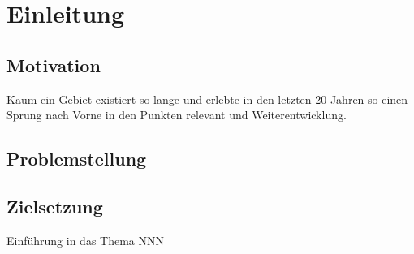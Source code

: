 \chapter{Einleitung}
\label{cha:Einleitung}

\section{Motivation}

Kaum ein Gebiet existiert so lange und erlebte in den letzten 20 Jahren so einen Sprung nach Vorne in den Punkten relevant und Weiterentwicklung. 


\section{Problemstellung}

\section{Zielsetzung}

Einführung in das Thema NNN





